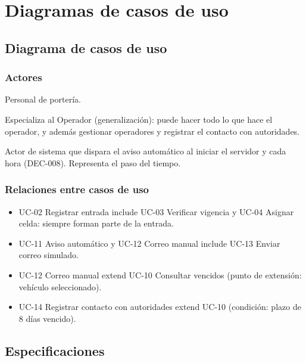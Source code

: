 \chapter{Diagramas de casos de uso}\label{cap:casos}

\section{Diagrama de casos de uso}

\subsection{Actores}
\begin{description}[style=nextline]
  \item[Operador] Personal de portería.
  \item[Administrador] Especializa al Operador (generalización): puede hacer todo lo que hace el operador, y además gestionar operadores y registrar el contacto con autoridades.
  \item[Planificador (APScheduler)] Actor de sistema que dispara el aviso automático al iniciar el servidor y cada hora (DEC-008). Representa el paso del tiempo.
\end{description}

\subsection{Relaciones entre casos de uso}
\begin{itemize}
  \item UC-02 Registrar entrada \guillemotleft include\guillemotright{} UC-03 Verificar vigencia y UC-04 Asignar celda: siempre forman parte de la entrada.
  \item UC-11 Aviso automático y UC-12 Correo manual \guillemotleft include\guillemotright{} UC-13 Enviar correo simulado.
  \item UC-12 Correo manual \guillemotleft extend\guillemotright{} UC-10 Consultar vencidos (punto de extensión: vehículo seleccionado).
  \item UC-14 Registrar contacto con autoridades \guillemotleft extend\guillemotright{} UC-10 (condición: plazo de 8 días vencido).
\end{itemize}

\section{Especificaciones}

